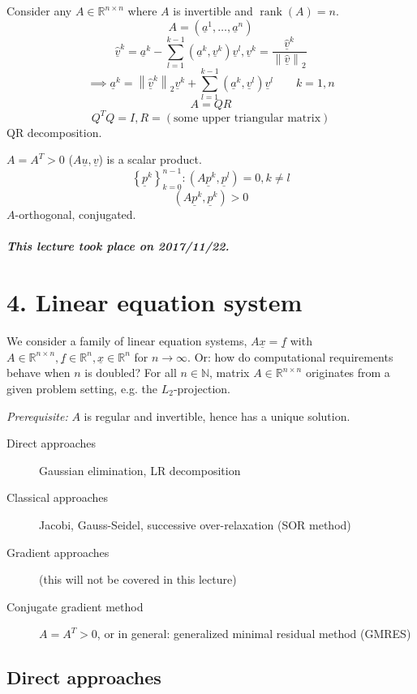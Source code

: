 \documentclass{article}
\newcommand{\set}[1]{\left\{#1\right\}}
\newcommand{\norm}[1]{\left\|#1\right\|}
\newcommand{\dateref}[1]{\paragraph{\textit{This lecture took place on #1.}}}
\begin{document}
Consider any $A \in \mathbb R^{n \times n}$ where $A$ is invertible and $\operatorname{rank}(A) = n$.
\[ A = (\underline{a}^1, \ldots, \underline{a}^n) \]
\[ \underline{\hat v}^k = \underline{a}^k - \sum_{l=1}^{k-1} (\underline{a}^k, \underline{v}^k) \underline{v}^l, \underline{v}^k = \frac{\underline{\hat v}^k}{\norm{\underline{\hat v}}_2} \]
\[ \implies \underline{a}^k = \norm{\underline{\hat v}^k}_2 \underline{v}^k + \sum_{l=1}^{k-1} (\underline{a}^k, \underline{v}^l) \underline{v}^l \qquad k = 1,n \]
\[ A = QR \]
\[ Q^TQ = I, R = (\text{some upper triangular matrix}) \]
QR decomposition.

$A = A^T > 0$ ($A\underline{u}, \underline{v}$) is a scalar product.
\[ \set{\underline{p}^k}_{k=0}^{n-1}: (A\underline{p}^k, \underline{p}^l) = 0, k \neq l \]
\[ (A\underline{p}^k, \underline{p}^k) > 0 \]
$A$-orthogonal, conjugated.

\dateref{2017/11/22}

\section{4. Linear equation system}

We consider a family of linear equation systems, $A \underline{x} = \underline{f}$ with $A \in \mathbb R^{n \times n}, \underline{f} \in \mathbb R^n, \underline{x} \in \mathbb R^n$ for $n \to \infty$. Or: how do computational requirements behave when $n$ is doubled?
For all $n \in \mathbb N$, matrix $A \in \mathbb R^{n \times n}$ originates from a given problem setting, e.g. the $L_2$-projection.

\emph{Prerequisite:} $A$ is regular and invertible, hence has a unique solution.
\begin{description}
  \item[Direct approaches] Gaussian elimination, LR decomposition
  \item[Classical approaches] Jacobi, Gauss-Seidel, successive over-relaxation (SOR method)
  \item[Gradient approaches] (this will not be covered in this lecture)
  \item[Conjugate gradient method] $A = A^T > 0$, or in general: generalized minimal residual method (GMRES)
\end{description}

\subsection{Direct approaches}
%
\end{document}

